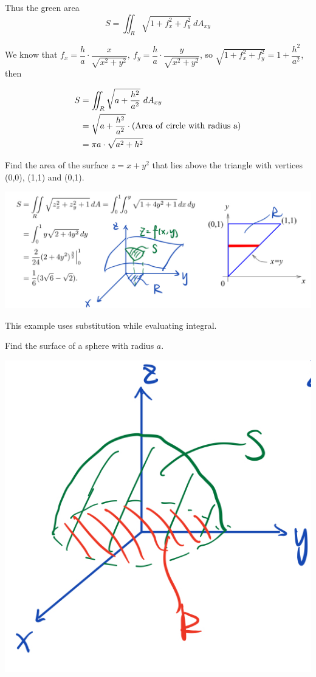 \begin{spacing}{1.3}
    Thus the green area $$S=\iint_R\sqrt{1+f_x^2+f_y^2}\ dA_{xy}$$

    We know that $f_x=\dfrac{h}{a}\cdot \dfrac{x}{\sqrt{x^2+y^2}},\ f_y=\dfrac{h}{a}\cdot \dfrac{y}{\sqrt{x^2+y^2}}$, so 
    $\sqrt{1+f_x^2+f_y^2}=1+\dfrac{h^2}{a^2}$, then

    \begin{align*}
        S &= \iint_R \sqrt{a+\frac{h^2}{a^2}}\ dA_{xy}\\ 
          &= \sqrt{a+\frac{h^2}{a^2}} \cdot {\rm (Area\ of\ circle\ with\ radius\ a)}\\
          &= \pi a\cdot \sqrt{a^2+h^2}
    \end{align*}

    \newpage
    \eg Find the area of the surface $z=x+y^2$ that lies above the triangle with vertices (0,0), (1,1)
    and (0,1).

    \sol 
    \begin{center}
        \includegraphics[scale=0.3]{images/Ch14-surface-area-eg3.jpeg}
    \end{center}


    \newpage
    {\blue This example uses substitution while evaluating integral.}

    \eg Find the surface of a sphere with radius $a$.
    \begin{center}
        \includegraphics[scale=0.25]{images/Ch14-surface-area-eg4.jpeg}
    \end{center}


\end{spacing}
